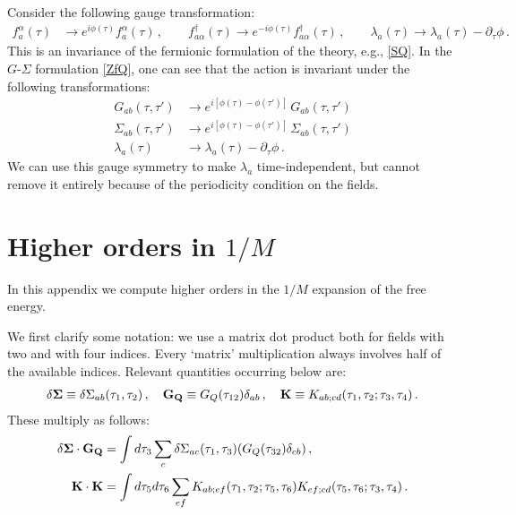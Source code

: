 \documentclass[aps,prx,preprint,onecolumn,citeautoscript,superscriptaddress,nofootinbib,
eqsecnum]{revtex4}
\begin{document}
{Consider the following gauge transformation:
\begin{equation}
    \begin{split}
    f_a^\alpha(\tau) &\longrightarrow e^{i\phi(\tau)}  f_a^\alpha(\tau) \,, \qquad 
    f^\dagger_{a\alpha}(\tau) \longrightarrow e^{-i\phi(\tau)}  f^\dagger_{a\alpha}(\tau) \,, \qquad
    \lambda_a(\tau) \longrightarrow \lambda_a(\tau) - \partial_\tau \phi \,.
    \end{split}
\end{equation}
This is an invariance of the fermionic formulation of the theory, e.g., \eqref{SQ}. In the $G$-$\Sigma$ formulation \eqref{ZfQ}, one can see that the action is invariant under the following transformations:
\begin{equation}
    \begin{split}
    G_{ab}(\tau,\tau') &\longrightarrow e^{i[\phi(\tau)-\phi(\tau')]}\, G_{ab}(\tau,\tau')\\
    \Sigma_{ab}(\tau,\tau') &\longrightarrow e^{i[\phi(\tau)-\phi(\tau')]}\, \Sigma_{ab}(\tau,\tau')\\
    \lambda_a(\tau) & \longrightarrow \lambda_a(\tau) - \partial_\tau \phi\,.
    \end{split}
\end{equation}
We can use this gauge symmetry to make $\lambda_a$ time-independent, but cannot remove it entirely because of the periodicity condition on the fields. 





\section{Higher orders in $1/M$}
\label{app:higherOrders}

In this appendix we compute higher orders in the $1/M$ expansion of the free energy.

We first clarify some notation: we use a matrix dot product both for fields with two and with four indices. Every `matrix' multiplication always involves half of the available indices. Relevant quantities occurring below are:
\begin{equation}
    \begin{split}
    \delta {\bf \Sigma} \equiv \delta \Sigma_{ab}(\tau_1,\tau_2) \,,\quad {\bf G_Q} \equiv G_Q(\tau_{12}) \delta_{ab} \,,\quad {\bf K} \equiv K_{ab;cd}(\tau_1,\tau_2;\tau_3,\tau_4) \,.
    \end{split}
\end{equation}
These multiply as follows:
\begin{equation}
    \begin{split}
    \delta {\bf \Sigma} \cdot {\bf G_Q} &= \int d\tau_3 \sum_c \delta \Sigma_{ac}(\tau_1,\tau_3) (G_Q(\tau_{32}) \delta_{cb} )\,, \\
    {\bf K} \cdot {\bf K} &= \int d\tau_5 d\tau_6 \sum_{ef} K_{ab;ef}(\tau_1,\tau_2;\tau_5,\tau_6) K_{ef;cd}(\tau_5,\tau_6;\tau_3,\tau_4) \,.
    \end{split}
\end{equation}


}
\end{document}
